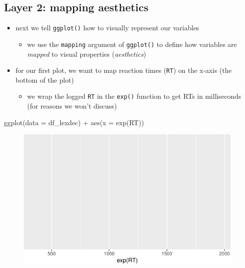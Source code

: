 \documentclass[
  letterpaper,
  DIV=11]{scrartcl}
\newenvironment{Shaded}{\begin{snugshade}}{\end{snugshade}}
\newcommand{\AttributeTok}[1]{\textcolor[rgb]{0.40,0.45,0.13}{#1}}
\newcommand{\FunctionTok}[1]{\textcolor[rgb]{0.28,0.35,0.67}{#1}}
\newcommand{\NormalTok}[1]{\textcolor[rgb]{0.00,0.23,0.31}{#1}}
\newcommand{\SpecialCharTok}[1]{\textcolor[rgb]{0.37,0.37,0.37}{#1}}
\providecommand{\tightlist}{%
  \setlength{\itemsep}{0pt}\setlength{\parskip}{0pt}}\usepackage{longtable,booktabs,array}
\theoremstyle{definition}
\theoremstyle{remark}
\begin{document}
\hypertarget{layer-2-mapping-aesthetics}{%
\subsection{Layer 2: mapping
aesthetics}\label{layer-2-mapping-aesthetics}}

\begin{itemize}
\tightlist
\item
  next we tell \texttt{ggplot()} how to visually represent our variables

  \begin{itemize}
  \tightlist
  \item
    we use the \texttt{mapping} argument of \texttt{ggplot()} to define
    how variables are \emph{mapped} to visual properties
    (\emph{aesthetics})
  \end{itemize}
\item
  for our first plot, we want to map reaction times (\texttt{RT}) on the
  x-axis (the bottom of the plot)

  \begin{itemize}
  \tightlist
  \item
    we wrap the logged \texttt{RT} in the \texttt{exp()} function to get
    RTs in milliseconds (for reasons we won't discuss)
  \end{itemize}
\end{itemize}

\begin{Shaded}
\begin{Highlighting}[]
\FunctionTok{ggplot}\NormalTok{(}\AttributeTok{data =}\NormalTok{ df\_lexdec) }\SpecialCharTok{+}
  \FunctionTok{aes}\NormalTok{(}\AttributeTok{x =} \FunctionTok{exp}\NormalTok{(RT))}
\end{Highlighting}
\end{Shaded}

\begin{figure}[H]

{\centering \includegraphics{_intro_r_slides_files/figure-pdf/unnamed-chunk-17-1.pdf}

}

\end{figure}
\end{document}
